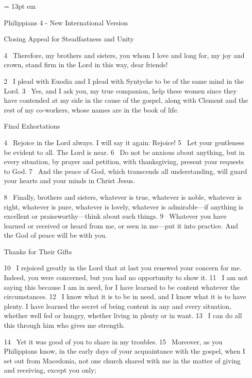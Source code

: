 

\FFrh \baselineskip = 13pt
 em


\centerline{  \FFbg
Philippians 4 - New International Version }

\par
Closing Appeal for Steadfastness and Unity
\par
4 
Therefore, my brothers and sisters, you whom I love and long for,
my joy and crown, stand firm
in the Lord in this way, dear friends!
\par
2 
I plead with Euodia and I plead with Syntyche to be of the same mind
in the Lord.
3 
Yes, and I ask you, my true companion, help these women since they have contended at my side in the cause of the gospel, along with Clement and the rest of my co-workers,
whose names are in the book of life.
\par
Final Exhortations
\par
4 
Rejoice in the Lord always. I will say it again: Rejoice!
5 
Let your gentleness be evident to all. The Lord is near.
6 
Do not be anxious about anything,
but in every situation, by prayer and petition, with thanksgiving, present your requests to God.
7 
And the peace of God,
which transcends all understanding,
will guard your hearts and your minds in Christ Jesus.
\par
8 
Finally, brothers and sisters, whatever is true, whatever is noble, whatever is right, whatever is pure, whatever is lovely, whatever is admirable—if anything is excellent or praiseworthy—think about such things.
9 
Whatever you have learned or received or heard from me, or seen in me—put it into practice.
And the God of peace
will be with you.
\par
Thanks for Their Gifts
\par
10 
I rejoiced greatly in the Lord that at last you renewed your concern for me.
Indeed, you were concerned, but you had no opportunity to show it.
11 
I am not saying this because I am in need, for I have learned to be content
whatever the circumstances.
12 
I know what it is to be in need, and I know what it is to have plenty. I have learned the secret of being content in any and every situation, whether well fed or hungry,
whether living in plenty or in want.
13 
I can do all this through him who gives me strength.
\par
14 
Yet it was good of you to share
in my troubles.
15 
Moreover, as you Philippians know, in the early days
of your acquaintance with the gospel, when I set out from Macedonia,
not one church shared with me in the matter of giving and receiving, except you only;
